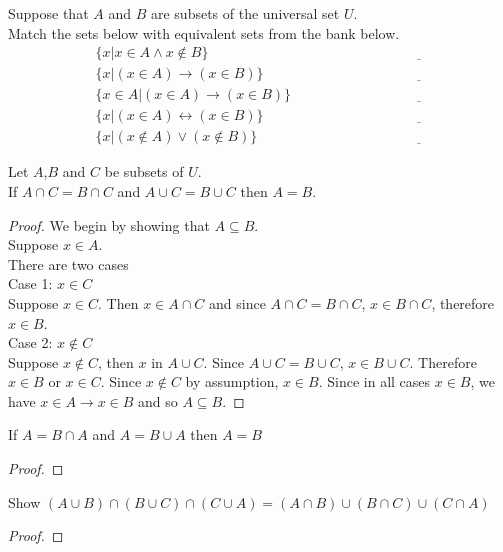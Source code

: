 \begin{exmp}
Suppose that $A$ and $B$ are subsets of the universal set $U$. 
\\
Match the sets below with equivalent sets from the bank below.
\begin{align}
&\{x| x\in A \land x \notin B\} \hspace{3cm}&\underline{\hspace{1cm}
}\\
&\{x| (x\in A) \to (x \in B)\} \hspace{3cm}&\underline{\hspace{1cm}
}\\
&\{x\in A| (x\in A) \to (x \in B)\} \hspace{3cm}&\underline{\hspace{1cm}
}\\
&\{x| (x\in A) \leftrightarrow (x \in B)\} \hspace{3cm}&\underline{\hspace{1cm}
}\\
&\{x| (x\notin A) \lor (x \notin B)\} \hspace{3cm}&\underline{\hspace{1cm}
}
\end{align}
\end{exmp}
\begin{exmp}
Let $A$,$B$ and $C$ be subsets of $U$.\\
If $A\cap C=B\cap C$ and $A\cup C =B\cup C$ then $A=B$.
\end{exmp}
\begin{proof}
We begin by showing that $A\subseteq B$.\\
Suppose $x\in A$.\\
There are two cases\\
Case 1: $x\in C$\\
Suppose $x \in C$. Then $x\in A\cap C$ and since $A\cap C=B\cap C$, $x\in B\cap C$, therefore $x \in B$.\\
Case 2: $x\notin C$\\
Suppose $x\notin C$, 
then $x$ in $A\cup C$. 
Since $A\cup C=B\cup C$, 
$x\in B\cup C$. 
Therefore $x\in B$ or $x \in C$.
Since $x \notin C$ by assumption, $x\in B$.
Since in all cases $x \in B$, we have $x \in A \to x \in B$ and so $A \subseteq B$.
\end{proof}

\begin{lem}
If $A=B\cap A$ and $A =B\cup A$ then $A=B$
\end{lem}
\begin{proof}
\vspace{5cm}
\end{proof}
\begin{exmp}
Show $(A\cup B)\cap (B\cup C)\cap (C\cup A) =(A\cap B)\cup (B\cap C)\cup (C\cap A)$
\end{exmp}
\begin{proof}

\end{proof}

